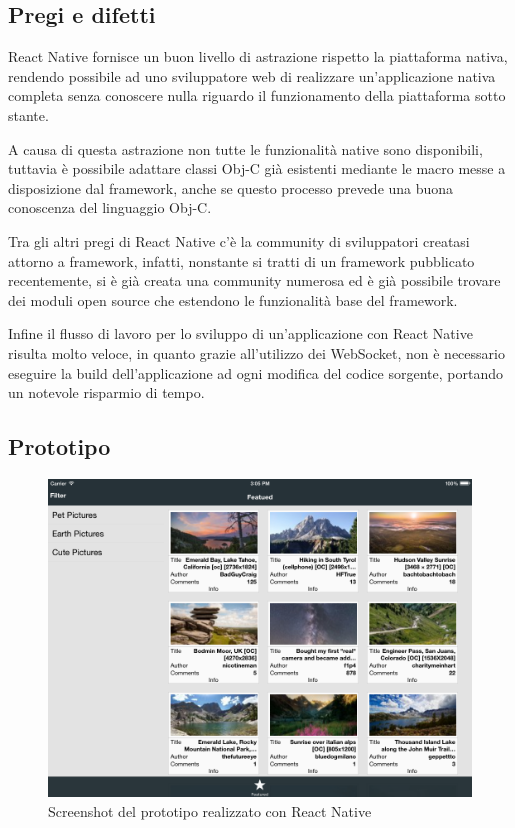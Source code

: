 \subsection{Pregi e difetti}

React Native fornisce un buon livello di astrazione rispetto la piattaforma nativa, rendendo possibile ad uno sviluppatore web di realizzare un'applicazione nativa completa senza conoscere nulla riguardo il funzionamento della piattaforma sotto stante.

A causa di questa astrazione non tutte le funzionalità native sono disponibili, tuttavia è possibile adattare classi Obj-C già esistenti mediante le macro messe a disposizione dal framework, anche se questo processo prevede una buona conoscenza del linguaggio Obj-C.

Tra gli altri pregi di React Native c'è la community di sviluppatori creatasi attorno a framework, infatti, nonstante si tratti di un framework pubblicato recentemente, si è già creata una community numerosa ed è già possibile trovare dei moduli open source che estendono le funzionalità base del framework.

Infine il flusso di lavoro per lo sviluppo di un'applicazione con React Native risulta molto veloce, in quanto grazie all'utilizzo dei WebSocket, non è necessario eseguire la build dell'applicazione ad ogni modifica del codice sorgente, portando un notevole risparmio di tempo.

\subsection{Prototipo}

\begin{figure}[htp]
\centering
\includegraphics[width=\textwidth]{../immagini/prototipo-react-native}
\caption{Screenshot del prototipo realizzato con React Native}  
\end{figure}


